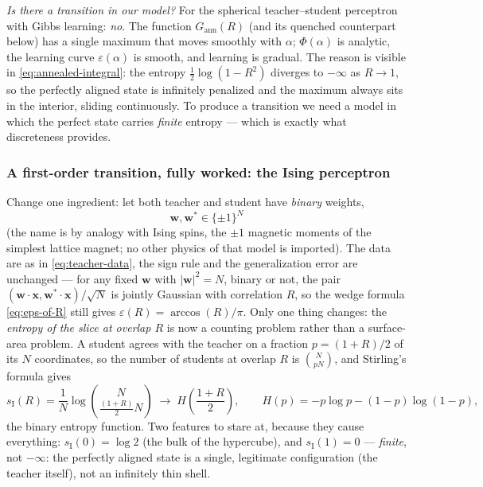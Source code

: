 \documentclass[11pt]{article}
\newcommand{\bv}[1]{\boldsymbol{#1}}
\begin{document}
\emph{Is there a transition in our model?} For the spherical teacher--student
perceptron with Gibbs learning: \emph{no}. The function
$G_{\mathrm{ann}}(R)$ (and its quenched counterpart below) has a single
maximum that moves smoothly with $\alpha$; $\Phi(\alpha)$ is analytic, the
learning curve $\varepsilon(\alpha)$ is smooth, and learning is gradual.
The reason is visible in \cref{eq:annealed-integral}: the entropy
$\tfrac12\log(1-R^2)$ diverges to $-\infty$ as $R \to 1$, so the perfectly
aligned state is infinitely penalized and the maximum always sits in the
interior, sliding continuously. To produce a transition we need a model in
which the perfect state carries \emph{finite} entropy --- which is exactly
what discreteness provides.

\subsubsection{A first-order transition, fully worked: the Ising perceptron}
\label{sec:ising}

Change one ingredient: let both teacher and student have \emph{binary}
weights,
\begin{equation}
  \label{eq:ising-setup}
  \bv{w}, \bv{w}^* \in \{\pm 1\}^N
\end{equation}
(the name is by analogy with Ising spins, the $\pm 1$ magnetic moments of
the simplest lattice magnet; no other physics of that model is imported).
The data are as in \cref{eq:teacher-data}, the sign rule and the
generalization error are unchanged --- for any fixed $\bv{w}$ with
$|\bv{w}|^2 = N$, binary or not, the pair $(\bv{w}\cdot\bv{x},
\bv{w}^*\cdot\bv{x})/\sqrt{N}$ is jointly Gaussian with correlation $R$,
so the wedge formula \cref{eq:eps-of-R} still gives
$\varepsilon(R) = \arccos(R)/\pi$. Only one thing changes: the
\emph{entropy of the slice at overlap $R$} is now a counting problem
rather than a surface-area problem. A student agrees with the teacher on a
fraction $p = (1+R)/2$ of its $N$ coordinates, so the number of students
at overlap $R$ is $\binom{N}{pN}$, and Stirling's formula gives
\begin{equation}
  \label{eq:ising-entropy}
  s_{\mathrm{I}}(R) = \frac1N \log\binom{N}{\frac{(1+R)}{2}N}
  \;\longrightarrow\;
  H\!\left(\frac{1+R}{2}\right),
  \qquad
  H(p) = -p\log p - (1-p)\log(1-p),
\end{equation}
the binary entropy function. Two features to stare at, because they cause
everything: $s_{\mathrm{I}}(0) = \log 2$ (the bulk of the hypercube), and
$s_{\mathrm{I}}(1) = 0$ --- \emph{finite}, not $-\infty$: the perfectly
aligned state is a single, legitimate configuration (the teacher itself),
not an infinitely thin shell.
\end{document}
